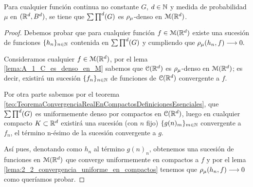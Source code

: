 %

\begin{teorema}\label{teo:2_2_denso_función_continua}
    Para cualquier función continua no constante $G$, $d \in \mathbb{N}$ y
    medida de probabilidad $\mu$ en $(\mathbb{R}^d, B^d)$, 
    se tiene que $\sum \prod^d (G)$ es $\rho_{\mu}$-denso en $\mathcal{M}(\mathbb{R}^d)$. 
\end{teorema} 

  
\begin{proof}
    Debemos probar que para cualquier función $f \in \mathcal{M}(\mathbb{R}^d)$ existe una 
    sucesión de funciones $\{h_n\}_{n\in \mathbb{N}}$ contenida en $\sum \prod^d (G)$ y 
    cumpliendo que $\rho_{\mu}(h_n, f) \longrightarrow 0.$

    Consideramos cualquier $f \in \mathcal{M}(\mathbb{R}^d)$,
    por el lema \ref{lema:A_1_C_es_denso_en_M} sabemos que $\mathcal{C}(\mathbb{R}^d)$ es $\rho_{\mu}$-denso en $\mathcal{M}(\mathbb{R}^d)$; 
    es decir, existirá un sucesión $\{f_n\}_{n\in \mathbb{N}}$ de funciones de $\mathcal{C}(\mathbb{R}^d)$ convergente a 
    $f$.  
    
    Por otra parte sabemos por el teorema \ref{teo:TeoremaConvergenciaRealEnCompactosDefinicionesEsenciales}, 
    que $\sum \prod^d (G)$ es uniformemente denso por compactos en $\mathcal{C}(\mathbb{R}^d)$, luego en cualquier compacto 
    $K \subset \mathbb{R}^d$ existirá una sucesión (con $n$ fijo) $\{g(n)_m \} _{m \in \mathbb{N}}$ convergente 
    a $f_n$, el término n-ésimo de la sucesión convergente a $g$. 

    Así pues, denotando como $h_n$ al término $g(n)_n$, obtenemos una sucesión de funciones 
    en $\mathcal{M}(\mathbb{R}^d)$ que converge uniformemente en compactos a $f$ y por el lema \ref{lema:2_2_convergencia_uniforme_en_compactos}
    tenemos que $\rho_{\mu}(h_n, f) \longrightarrow 0$ como queríamos probar.     
\end{proof}

